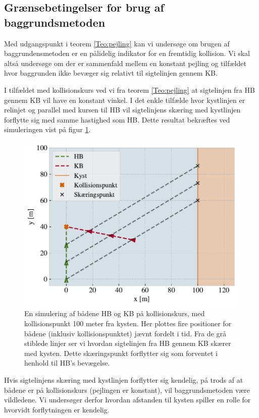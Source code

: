 \documentclass[%
 reprint,
nofootinbib,
aps,
]{revtex4-1}
\begin{document}
\subsection{Grænsebetingelser for brug af baggrundsmetoden}
Med udgangspunkt i teorem \ref{Teo:pejling} kan vi undersøge om brugen af baggrundensmetoden er en pålidelig indikator for en fremtidig kollision.
Vi skal altså undersøge om der er sammenfald mellem en konstant pejling og tilfældet hvor baggrunden ikke bevæger sig relativt til sigtelinjen gennem KB. \par
I tilfældet med kollisionskurs ved vi fra teorem \ref{Teo:pejling} at sigtelinjen fra HB gennem KB vil have en konstant vinkel. I det enkle tilfælde hvor kystlinjen er relinjet og parallel med kursen til HB vil sigtelinjens skæring med kystlinjen forflytte sig med samme hastighed som HB. Dette resultat bekræftes ved simuleringen vist på figur \ref{fig:eks1}.
\begin{figure}[H]
 \includegraphics[width=\linewidth]{figures/eksempel1.pdf}
 \caption{En simulering af bådene HB og KB på kollisionskurs, med kollisionspunkt 100 meter fra kysten. Her plottes fire positioner for bådene (inklusiv kollisionspunktet) jævnt fordelt i tid. Fra de grå stiblede linjer ser vi hvordan sigtelinjen fra HB gennem KB skærer med kysten. Dette skæringspunkt forflytter sig som forventet i henhold til HB's bevægelse.}
 \label{fig:eks1}
\end{figure}
 Hvis sigtelinjens skæring med kystlinjen forflytter sig kendelig, på trods af at bådene er på kollisionskurs (pejlingen er konstant), vil baggrundsmetoden være vildledene. Vi undersøger derfor hvordan afstanden til kysten spiller en rolle for hvorvidt forflytningen er kendelig. \par
\end{document}
